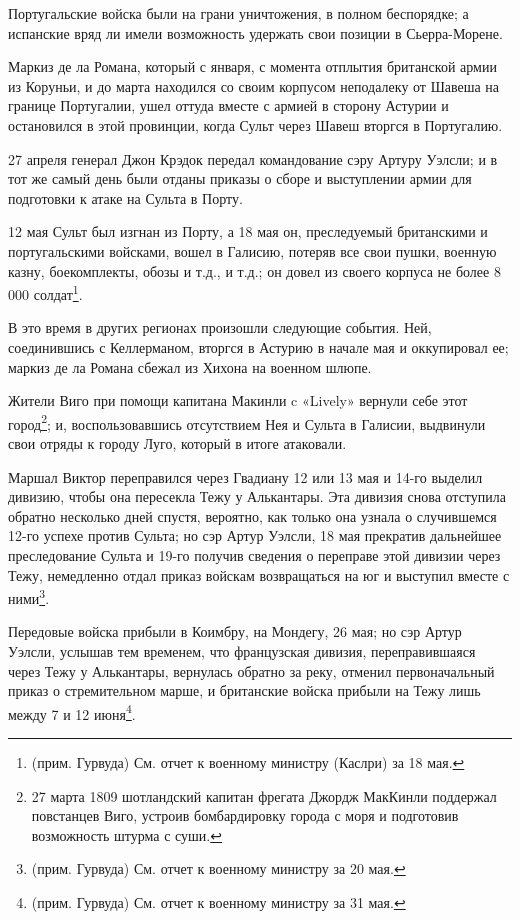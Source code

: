 \documentclass[
  oneside,
  12pt,
  titlepage]{book}
\begin{document}
Португальские войска были на грани уничтожения, в полном беспорядке; а испанские вряд ли имели возможность удержать свои позиции в Сьерра-Морене.

Маркиз де ла Романа, который с января, с момента отплытия британской армии из Коруньи, и до марта находился со своим корпусом неподалеку от Шавеша на границе Португалии, ушел оттуда вместе с армией в сторону Астурии и остановился в этой провинции, когда Сульт через Шавеш вторгся в Португалию.

27 апреля генерал Джон Крэдок передал командование сэру Артуру Уэлсли; и в тот же самый день были отданы приказы о сборе и выступлении армии для подготовки к атаке на Сульта в Порту.

12 мая Сульт был изгнан из Порту, а 18 мая он, преследуемый британскими и португальскими войсками, вошел в Галисию, потеряв все свои пушки, военную казну, боекомплекты, обозы и т.д., и т.д.; он довел из своего корпуса не более 8 000 солдат\footnote{(прим. Гурвуда) См. отчет к военному министру (Каслри) за 18 мая.}.

В это время в других регионах произошли следующие события. Ней, соединившись с Келлерманом, вторгся в Астурию в начале мая и оккупировал ее; маркиз де ла Романа сбежал из Хихона на военном шлюпе.

Жители Виго при помощи капитана Макинли c «Lively» вернули себе этот город\footnote{27 марта 1809 шотландский капитан фрегата Джордж МакКинли поддержал повстанцев Виго, устроив бомбардировку города с моря и подготовив возможность штурма с суши.}; и, воспользовавшись отсутствием Нея и Сульта в Галисии, выдвинули свои отряды к городу Луго, который в итоге атаковали.

Маршал Виктор переправился через Гвадиану 12 или 13 мая и 14-го выделил дивизию, чтобы она пересекла Тежу у Алькантары. Эта дивизия снова отступила обратно несколько дней спустя, вероятно, как только она узнала о случившемся 12-го успехе против Сульта; но сэр Артур Уэлсли, 18 мая прекратив дальнейшее преследование Сульта и 19-го получив сведения о переправе этой дивизии через Тежу, немедленно отдал приказ войскам возвращаться на юг и выступил вместе с ними\footnote{(прим. Гурвуда) См. отчет к военному министру за 20 мая.}.

Передовые войска прибыли в Коимбру, на Мондегу, 26 мая; но сэр Артур Уэлсли, услышав тем временем, что французская дивизия, переправившаяся через Тежу у Алькантары, вернулась обратно за реку, отменил первоначальный приказ о стремительном марше, и британские войска прибыли на Тежу лишь между 7 и 12 июня\footnote{(прим. Гурвуда) См. отчет к военному министру за 31 мая.}.
\end{document}
